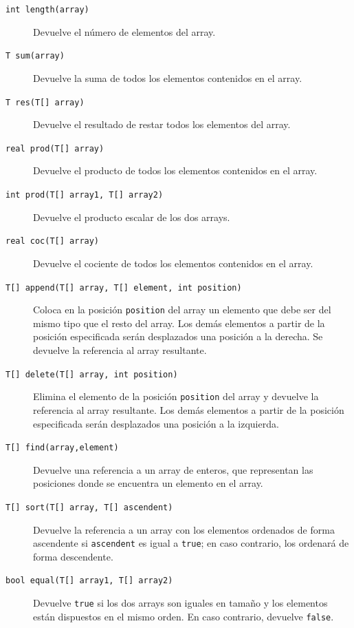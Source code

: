 \documentclass[11pt, english]{article}
\begin{document}
\begin{description}
	\begin{description} 
		\item [\texttt{int length(array)}] Devuelve el número de elementos del array.
		\item [\texttt{T sum(array)}] Devuelve la suma de todos los elementos contenidos en el array.
		\item [\texttt{T res(T[] array)}] Devuelve el resultado de restar todos los elementos del array.
		\item [\texttt{real prod(T[] array)}] Devuelve el producto de todos los elementos contenidos en el array.
		\item [\texttt{int prod(T[] array1, T[] array2)}] Devuelve el producto escalar de los dos arrays.
		\item [\texttt{real coc(T[] array)}] Devuelve el cociente de todos los elementos contenidos en el array.
		\item [\texttt{T[] append(T[] array, T[] element, int position)}] Coloca en la posición \texttt{position} del array un elemento que debe ser del mismo tipo que el resto del array. Los demás elementos a partir de la posición especificada serán desplazados una posición a la derecha.
Se devuelve la referencia al array resultante.
		\item [\texttt{T[] delete(T[] array, int position)}] Elimina el elemento de la posición \texttt{position} del array y devuelve la referencia al array resultante. Los demás elementos a partir de la posición especificada serán desplazados una posición a la izquierda. 
		\item [\texttt{T[] find(array,element)}] Devuelve una referencia a un array de enteros, que representan las posiciones donde se encuentra un elemento en el array.
		\item [\texttt{T[] sort(T[] array, T[] ascendent)}] Devuelve la referencia a un array con los elementos ordenados de forma ascendente si \texttt{ascendent} es igual a \texttt{true}; en caso contrario, los ordenará de forma descendente.
		\item [\texttt{bool equal(T[] array1, T[] array2)}] Devuelve \texttt{true} si los dos arrays son iguales en tamaño y los elementos están dispuestos en el mismo orden. En caso contrario, devuelve \texttt{false}.
	\end{description} 
\end{description} 
\end{document}
